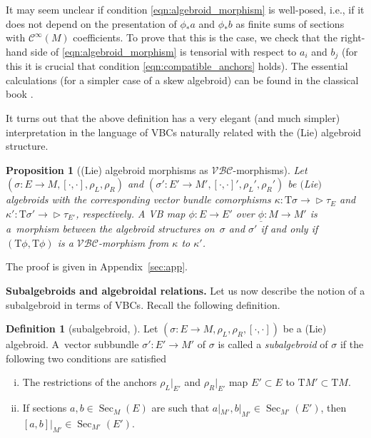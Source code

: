 \documentclass[10pt,a4paper]{amsart}
\newcommand{\ZM}{{VBC}} %
\newcommand{\Zakrzewski}{{vector bundle comorphism}}
\newcommand{\und}{\underline}
\newcommand{\Sec}{\operatorname{Sec}}
\newcommand{\ra}{\rightarrow}
\newcommand{\rhoL}{\rho_L} %
\newcommand{\rhoR}{\rho_R}
\newcommand{\T}{\mathrm{T}} %
\newcommand{\catZM}{{\mathcal{VBC}}} %
\newcommand{\Cf}{\mathcal{C}^\infty}
\def\relto{\rightarrow\!\!\vartriangleright} %
\numberwithin{equation}{section}
\newtheorem{prop}[thm]{Proposition}
\theoremstyle{definition}
\newtheorem{df}[thm]{Definition}
\begin{document}
It may seem unclear if condition \eqref{eqn:algebroid_morphism} is well-posed, i.e., if it does not depend on the presentation of $\phi_\ast a$ and $\phi_\ast b$ as finite sums of sections with $\Cf(M)$ coefficients. To prove that this is the case, we check that the right-hand side of \eqref{eqn:algebroid_morphism} is tensorial with respect to $a_i$ and $b_j$ (for this it is crucial that condition \eqref{eqn:compatible_anchors} holds). The essential calculations (for a simpler case of a skew algebroid) can be found in the classical book \cite{Mackenzie_lie_2005}.

It turns out that the above definition has a very elegant (and much simpler) interpretation in the language of \ZM s naturally related with the (Lie) algebroid structure.
\begin{prop}[(Lie) algebroid morphisms as $\catZM$-morphisms]\label{prop:alg_morphism}
Let $(\sigma\colon E\!\ra\! M,[\cdot,\cdot],\rhoL,\rhoR)$ and $(\sigma'\colon E' \ra M',[\cdot,\cdot]',\rhoL',\rhoR')$ be $($Lie$)$ algebroids with the corresponding \Zakrzewski s {$\kappa\colon \T\sigma\relto \tau_{E}$} and $\kappa'\colon \T\sigma'\relto \tau_{E'}$, respectively. A VB map $\phi\colon E\ra E'$ over $\und{\phi}\colon M\ra M'$ is a~morphism between the algebroid structures on~$\sigma$ and $\sigma'$ if and only if $(\T\phi,\T\phi)$ is a $\catZM$-morphism from $\kappa$ to $\kappa'$.
\end{prop}
The proof is given in Appendix~\ref{sec:app}.

{\bf Subalgebroids and algebroidal relations.} Let us now describe the notion of a subalgebroid in terms of \ZM s. Recall the following definition.

\begin{df}[subalgebroid, \cite{JG_mod_class_skew_alg_rel_2012, Mackenzie_lie_2005}]\label{def:sublagebroid}
Let $(\sigma\colon E\ra M, \rhoL,\rhoR, [\cdot, \cdot])$ be a (Lie) algebroid. A~vector subbundle $\sigma'\colon E'\ra M'$ of $\sigma$ is called a \emph{subalgebroid} of $\sigma$ if the following two conditions are satisfied
\begin{enumerate}[(i)]\itemsep=0pt
 \item \label{df:sub_algebroid_1} The restrictions of the anchors $\rhoL|_{E'}$ and $\rhoR|_{E'}$ map $E'\subset E$ to $\T M'\subset \T M$.
 \item \label{df:sub_algebroid_2} If sections $a,b\in\Sec_M(E)$ are such that $a|_{M'},b|_{M'} \in \Sec_{M'}(E')$, then $[a, b]|_{M'} \in \Sec_{M'}(E')$.
\end{enumerate}
\end{df}
\end{document}
